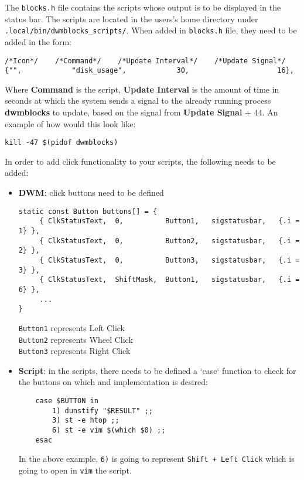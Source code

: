 \documentclass{article}
\begin{document}
\noindent The \texttt{blocks.h} file contains the scripts whose output is to be displayed in the status bar. The scripts are located in the users's home directory under \texttt{.local/bin/dwmblocks\_scripts/}. When added in \texttt{blocks.h} file, they need to be added in the form:

\begin{lstlisting}
/*Icon*/    /*Command*/    /*Update Interval*/    /*Update Signal*/
{"",			"disk_usage",            30,		             16},
\end{lstlisting}

\noindent Where \textbf{Command} is the script, \textbf{Update Interval} is the amount of time in seconds at which the system sends a signal to the already running process \textbf{dwmblocks} to update, based on the signal from \textbf{Update Signal} + 44. An example of how would this look like:
\lstset{language=sh}
\begin{lstlisting}
kill -47 $(pidof dwmblocks)
\end{lstlisting}

\noindent In order to add click functionality to your scripts, the following needs to be added:
\lstset{language=C}
\begin{itemize}
	\item \textbf{DWM}: click buttons need to be defined
		\begin{lstlisting}
static const Button buttons[] = {
     { ClkStatusText,  0,          Button1,   sigstatusbar,   {.i = 1} },
     { ClkStatusText,  0,          Button2,   sigstatusbar,   {.i = 2} },
     { ClkStatusText,  0,          Button3,   sigstatusbar,   {.i = 3} },
     { ClkStatusText,  ShiftMask,  Button1,   sigstatusbar,   {.i = 6} },
     ...
}
		\end{lstlisting}
	\texttt{Button1} represents Left Click\\
	\texttt{Button2} represents Wheel Click\\
	\texttt{Button3} represents Right Click
	
	\item \textbf{Script}: in the scripts, there needs to be defined a `case` function to check for the buttons on which and implementation is desired:
	\lstset{language=bash}
	\begin{lstlisting}
	case $BUTTON in
        1) dunstify "$RESULT" ;;
        3) st -e htop ;;
        6) st -e vim $(which $0) ;;
	esac
	\end{lstlisting}
	\lstset{language=C}
	In the above example, \texttt{6)} is going to represent \texttt{Shift + Left Click} which is going to open in \texttt{vim} the script.
\end{itemize}
\end{document}
